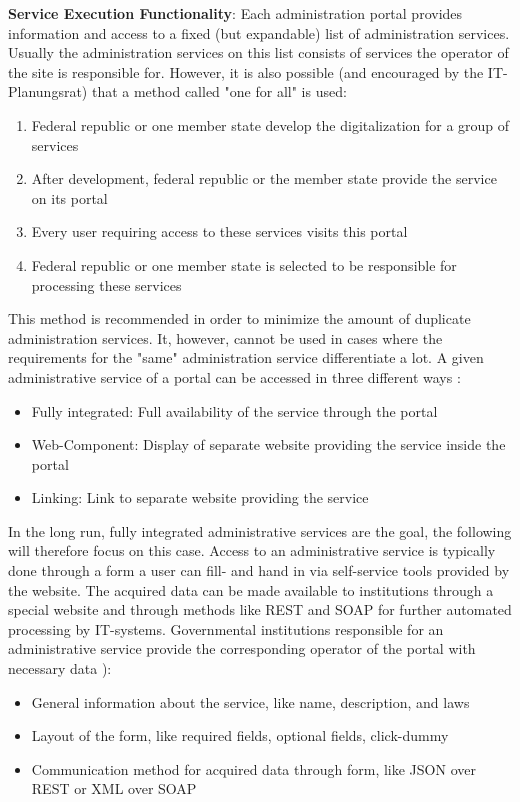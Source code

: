 \documentclass[
     12pt,         %
     a4paper,      %
     BCOR=10mm,version=first,     %
     DIV=14,version=first,        %
     ]{scrreprt}
\begin{document}
\textbf{Service Execution Functionality}: 
Each administration portal provides information and access to a fixed (but expandable) list of administration services. Usually the administration services on this list consists of services the operator of the site is responsible for. However, it is also possible (and encouraged by the IT-Planungsrat) that a method called "one for all" is used:
\begin{enumerate}
    \item Federal republic or one member state develop the digitalization for a group of services
    \item After development, federal republic or the member state provide the service on its portal
    \item Every user requiring access to these services visits this portal
    \item Federal republic or one member state is selected to be responsible for processing these services
\end{enumerate}
This method is recommended in order to minimize the amount of duplicate administration services. It, however, cannot be used in cases where the requirements for the "same" administration service differentiate a lot.
A given administrative service of a portal can be accessed in three different ways \cite{BMI:Integrationsleitfaden_Bund}:
\begin{itemize}
    \item Fully integrated:	Full availability of the service through the portal
    \item Web-Component:	Display of separate website providing the service inside the portal
    \item Linking:			Link to separate website providing the service
\end{itemize}
In the long run, fully integrated administrative services are the goal, the following will therefore focus on this case. 
Access to an administrative service is typically done through a form a user can fill- and hand in via self-service tools provided by the website. The acquired data can be made available to institutions through a special website and through methods like REST and SOAP for further automated processing by IT-systems. 
Governmental institutions responsible for an administrative service provide the corresponding operator of the portal with necessary data \cite[88]{BMI:Integrationsleitfaden_Bund}):
\begin{itemize}
    \item General information about the service, like name, description, and laws
    \item Layout of the form, like required fields, optional fields, click-dummy
    \item Communication method for acquired data through form, like JSON over REST or XML over SOAP
\end{itemize}
\end{document}
